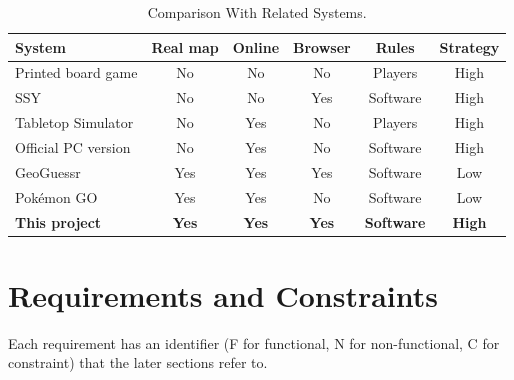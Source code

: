 \documentclass[lettersize,journal]{IEEEtran}
\begin{document}
\begin{table}[!t]
\caption{Comparison With Related Systems.}
\label{tab:related}
\centering
\small
\begin{tabular}{@{}lccccc@{}}
\toprule
System & Real map & Online & Browser & Rules & Strategy \\
\midrule
Printed board game \cite{rules_1983} & No & No & No & Players & High \\
SSY \cite{ssy} & No & No & Yes & Software & High \\
Tabletop Simulator \cite{tts} & No & Yes & No & Players & High \\
Official PC version \cite{official_pc} & No & Yes & No & Software & High \\
GeoGuessr \cite{geoguessr} & Yes & Yes & Yes & Software & Low \\
Pok\'emon GO \cite{paavilainen2017pokemon} & Yes & Yes & No & Software & Low \\
\textbf{This project} & \textbf{Yes} & \textbf{Yes} & \textbf{Yes} & \textbf{Software} & \textbf{High} \\
\bottomrule
\end{tabular}
\end{table}

\section{Requirements and Constraints}\label{sec:requirements}

Each requirement has an identifier (F for functional, N for non-functional, C for constraint) that the later sections refer to.
\end{document}
